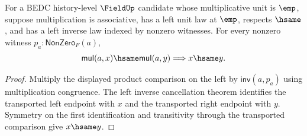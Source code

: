 \begin{theorem}
\label{thm:field-empty-unit-left-mul-cancel-from-apartness}
For a BEDC history-level $\FieldUp$ candidate whose multiplicative unit is
$\emp$, suppose multiplication is associative, has a left unit law at $\emp$,
respects $\hsame$, and has a left inverse law indexed by nonzero witnesses.
For every nonzero witness $p_a:\mathsf{NonZero}_F(a)$,
$$
\mathsf{mul}(a,x)\hsame\mathsf{mul}(a,y)
\Longrightarrow
x\hsame y.
$$
\end{theorem}
\begin{proof}
Multiply the displayed product comparison on the left by
$\mathsf{inv}(a,p_a)$ using multiplication congruence. The left inverse
cancellation theorem identifies the transported left endpoint with $x$ and
the transported right endpoint with $y$. Symmetry on the first identification
and transitivity through the transported comparison give $x\hsame y$.
\end{proof}

